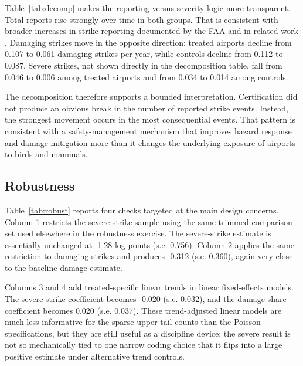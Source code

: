 \documentclass[12pt]{article}
\begin{document}
Table~\ref{tab:decomp} makes the reporting-versus-severity logic more transparent. Total reports rise strongly over time in both groups. That is consistent with broader increases in strike reporting documented by the FAA and in related work \citep{faa_wildlife_db_2024,Altringer_2023}. Damaging strikes move in the opposite direction: treated airports decline from 0.107 to 0.061 damaging strikes per year, while controls decline from 0.112 to 0.087. Severe strikes, not shown directly in the decomposition table, fall from 0.046 to 0.006 among treated airports and from 0.034 to 0.014 among controls.

The decomposition therefore supports a bounded interpretation. Certification did not produce an obvious break in the number of reported strike events. Instead, the strongest movement occurs in the most consequential events. That pattern is consistent with a safety-management mechanism that improves hazard response and damage mitigation more than it changes the underlying exposure of airports to birds and mammals.

\subsection{Robustness}

\begin{table}[!htbp]
\centering
\caption{Robustness checks}
\label{tab:robust}

\end{table}

Table~\ref{tab:robust} reports four checks targeted at the main design concerns. Column 1 restricts the severe-strike sample using the same trimmed comparison set used elsewhere in the robustness exercise. The severe-strike estimate is essentially unchanged at -1.28 log points (s.e. 0.756). Column 2 applies the same restriction to damaging strikes and produces -0.312 (s.e. 0.360), again very close to the baseline damage estimate.

Columns 3 and 4 add treated-specific linear trends in linear fixed-effects models. The severe-strike coefficient becomes -0.020 (s.e. 0.032), and the damage-share coefficient becomes 0.020 (s.e. 0.037). These trend-adjusted linear models are much less informative for the sparse upper-tail counts than the Poisson specifications, but they are still useful as a discipline device: the severe result is not so mechanically tied to one narrow coding choice that it flips into a large positive estimate under alternative trend controls.
\end{document}
